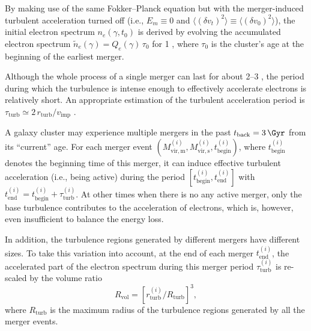 \documentclass[twocolumn]{aastex62}
\newcommand{\R}[1]{\mathrm{#1}}
\newcommand{\editone}[1]{{\leavevmode\color{cyan}#1}}
\begin{document}
\editone{%
By making use of the same Fokker--Planck equation but with the
merger-induced turbulent acceleration turned off (i.e., $E_m \equiv 0$ and
$\langle (\delta v_t)^2 \rangle \equiv \langle (\delta v_0)^2 \rangle$),}  %
the initial electron spectrum $n_e(\gamma, t_0)$ is derived by evolving the
accumulated electron spectrum $\tilde{n}_e(\gamma) = Q_e(\gamma) \,\tau_0$
for \SI{1}{\Gyr} \citep[e.g.,][]{brunetti2007}, where $\tau_0$ is the
cluster's age at the beginning of the earliest merger.

Although the whole process of a single merger can last for about
\SIrange{2}{3}{\Gyr} \citep[e.g.,][]{tormen2004,cassano2016}, the period
during which the turbulence is intense enough to effectively accelerate
electrons is relatively short.
An appropriate estimation of the turbulent acceleration period is
$\tau_{\R{turb}} \simeq 2 \,r_{\R{turb}} / v_{\R{imp}}$ \citep{miniati2015}.
\editone{%
A galaxy cluster may experience multiple mergers in the past
$t_{\R{back}} = \SI{3}{\Gyr}$ from its \enquote{current} age.
For each merger event
$\left( M^{(i)}_{\R{vir,m}}, M^{(i)}_{\R{vir,s}}, t^{(i)}_{\R{begin}} \right)$,
where $t^{(i)}_{\R{begin}}$ denotes the beginning time of this merger,
it can induce effective turbulent acceleration (i.e., being active) during
the period $\left[ t^{(i)}_{\R{begin}}, t^{(i)}_{\R{end}} \right]$ with
$t^{(i)}_{\R{end}} = t^{(i)}_{\R{begin}}+\tau^{(i)}_{\R{turb}}$.
At other times when there is no any active merger, only the base
turbulence contributes to the acceleration of electrons, which is, however,
even insufficient to balance the energy loss.

In addition, the turbulence regions generated by different mergers have
different sizes.
To take this variation into account, at the end of each merger
$t^{(i)}_{\R{end}}$, the accelerated part of the electron spectrum during
this merger period $\tau^{(i)}_{\R{turb}}$ is re-scaled by the volume ratio
\begin{equation}
  \label{eq:ratio-v}
  R_{\R{vol}} = \left[ r^{(i)}_{\R{turb}} / R_{\R{turb}} \right]^3 ,
\end{equation}
where $R_{\R{turb}}$ is the maximum radius of the turbulence regions
generated by all the merger events.
} %
\end{document}
